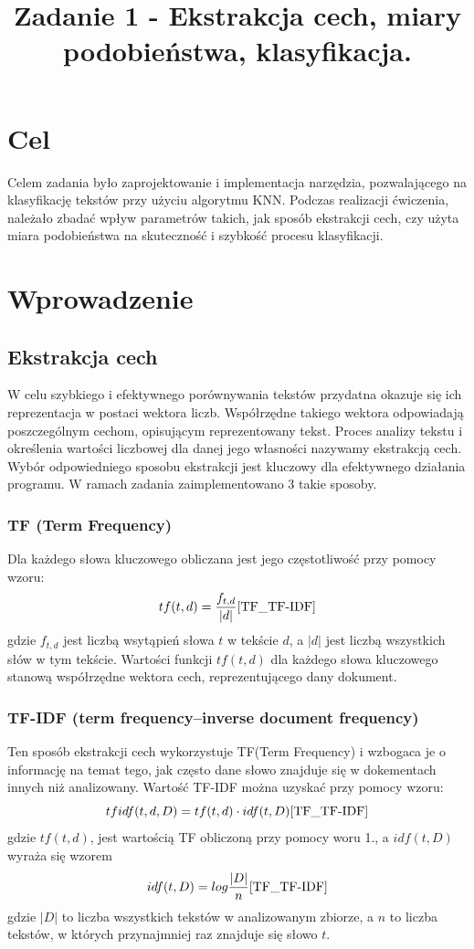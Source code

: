 \documentclass{classrep}
\author{
  \studentinfo{Paweł Młynarczyk}{210278} \and
  \studentinfo{Mateusz Kuźniarek}{210245}
}
\title{Zadanie 1 - Ekstrakcja cech, miary podobieństwa, klasyfikacja.}
\begin{document}
\maketitle

\section{Cel}
Celem zadania było zaprojektowanie i implementacja narzędzia, pozwalającego na klasyfikację tekstów przy użyciu algorytmu KNN. Podczas realizacji ćwiczenia, należało zbadać wpływ parametrów takich, jak sposób ekstrakcji cech, czy użyta miara podobieństwa na skuteczność i szybkość procesu klasyfikacji.

\section{Wprowadzenie}
\subsection{Ekstrakcja cech}
W celu szybkiego i efektywnego porównywania tekstów przydatna okazuje się ich reprezentacja w postaci wektora liczb. Współrzędne takiego wektora odpowiadają poszczególnym cechom, opisującym reprezentowany tekst. Proces analizy tekstu i określenia wartości liczbowej dla danej jego własności nazywamy ekstrakcją cech. Wybór odpowiedniego sposobu ekstrakcji jest kluczowy dla efektywnego działania programu. W ramach zadania zaimplementowano 3 takie sposoby.

\subsubsection{TF (Term Frequency)}
Dla każdego słowa kluczowego obliczana jest jego częstotliwość przy pomocy wzoru: 
\begin{equation}
tf(t,d) =  \frac{f_{t,d}}{|d|} \cite{TF_TF-IDF}
\end{equation}
gdzie \(f_{t,d}\) jest liczbą wsytąpień słowa \(t\) w tekście \(d\), a \(|d|\) jest liczbą wszystkich słów w tym tekście. Wartości funkcji \(tf(t,d)\) dla każdego słowa kluczowego stanową współrzędne wektora cech, reprezentującego dany dokument.

\subsubsection{TF-IDF (term frequency–inverse document frequency)}
Ten sposób ekstrakcji cech wykorzystuje TF(Term Frequency) i wzbogaca je o informację na temat tego, jak często dane słowo znajduje się w dokementach innych niż analizowany. Wartość TF-IDF można uzyskać przy pomocy wzoru: 
\begin{equation}
tfidf(t,d,D) = tf(t,d) \cdot idf(t,D) \cite{TF_TF-IDF}
\end{equation}
gdzie \(tf(t,d)\), jest wartością TF obliczoną przy pomocy woru 1., a \(idf(t,D)\) wyraża się wzorem
\begin{equation}
idf(t,D) = log\frac{|D|}{n} \cite{TF_TF-IDF}
\end{equation}
gdzie \(|D|\) to liczba wszystkich tekstów w analizowanym zbiorze, a \(n\) to liczba tekstów, w których przynajmniej raz znajduje się słowo \(t\).
\end{document}
